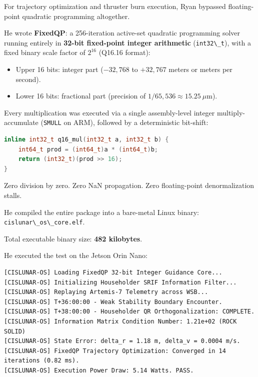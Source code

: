 \documentclass[12pt,twoside,openright]{book}
\providecommand{\tightlist}{\setlength{\itemsep}{0pt}\setlength{\parskip}{0pt}
\setlength{\tabcolsep}{2pt}}
\begin{document}
For trajectory optimization and thruster burn execution, Ryan bypassed
floating-point quadratic programming altogether.

He wrote \textbf{FixedQP}: a 256-iteration active-set quadratic
programming solver running entirely in \textbf{32-bit fixed-point
integer arithmetic} (\passthrough{\lstinline!int32\_t!}), with a fixed
binary scale factor of \(2^{16}\) (Q16.16 format):

\begin{itemize}
\tightlist
\item
  Upper 16 bits: integer part (\(-32,768\) to \(+32,767\) meters or
  meters per second).
\item
  Lower 16 bits: fractional part (precision of
  \(1/65,536 \approx 15.25\ \mu\text{m}\)).
\end{itemize}

Every multiplication was executed via a single assembly-level integer
multiply-accumulate (\passthrough{\lstinline!SMULL!} on ARM), followed
by a deterministic bit-shift:

\begin{lstlisting}[language={C++}]
inline int32_t q16_mul(int32_t a, int32_t b) {
    int64_t prod = (int64_t)a * (int64_t)b;
    return (int32_t)(prod >> 16);
}
\end{lstlisting}

Zero division by zero. Zero NaN propagation. Zero floating-point
denormalization stalls.

He compiled the entire package into a bare-metal Linux binary:
\passthrough{\lstinline!cislunar\_os\_core.elf!}.

Total executable binary size: \textbf{482 kilobytes}.

He executed the test on the Jetson Orin Nano:

\begin{lstlisting}
[CISLUNAR-OS] Loading FixedQP 32-bit Integer Guidance Core...
[CISLUNAR-OS] Initializing Householder SRIF Information Filter...
[CISLUNAR-OS] Replaying Artemis-7 Telemetry across WSB...
[CISLUNAR-OS] T+36:00:00 - Weak Stability Boundary Encounter.
[CISLUNAR-OS] T+38:00:00 - Householder QR Orthogonalization: COMPLETE.
[CISLUNAR-OS] Information Matrix Condition Number: 1.21e+02 (ROCK SOLID)
[CISLUNAR-OS] State Error: delta_r = 1.18 m, delta_v = 0.0004 m/s.
[CISLUNAR-OS] FixedQP Trajectory Optimization: Converged in 14 iterations (0.82 ms).
[CISLUNAR-OS] Execution Power Draw: 5.14 Watts. PASS.
\end{lstlisting}
\end{document}
